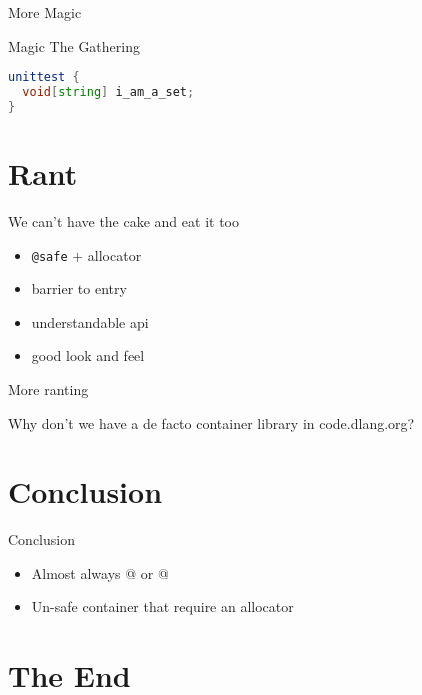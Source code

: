 \documentclass[aspectratio=169,notes]{beamer}
\begin{document}
	\begin{frame}[fragile]{More Magic}
		
	\end{frame}

	\begin{frame}[fragile]{Magic The Gathering}
		\begin{lstlisting}[language=D]
unittest {
  void[string] i_am_a_set;
}
\end{lstlisting}
	\end{frame}

	\section{Rant}
	\begin{frame}[fragile]{We can't have the cake and eat it too}
		\begin{itemize}
			\item \lstinline|@safe| $+$ allocator
			\item barrier to entry
			\item understandable api
			\item good look and feel
		\end{itemize}
	\end{frame}

	\begin{frame}[fragile]{More ranting}
		\begin{centering}
		\large
		Why don't we have a de facto container library in code.dlang.org?
		\end{centering}
	\end{frame}
	
	\section{Conclusion}
	\begin{frame}[fragile]{Conclusion}
		\begin{itemize}
			\item Almost always \lstinline@int[]@ or \lstinline@int[string]@\\[1cm]
			\pause
			\item Un-safe container that require an allocator
		\end{itemize}
	\end{frame}

	\section{The End}
\end{document}
